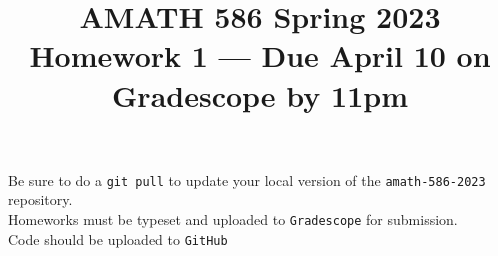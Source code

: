 \documentclass[10pt]{amsart}
\begin{document}
\pagestyle{empty}

\newcommand{\mline}{\vspace{.2in}\hrule\vspace{.2in}}


\title{\bf { AMATH 586 Spring 2023 \\ Homework 1 ---
Due April 10 on Gradescope by 11pm} }
\maketitle
\begin{center} Be sure to do a {\tt git pull} to update your local
  version of the {\tt amath-586-2023} repository.\\  Homeworks must be
  typeset and uploaded to {\tt Gradescope} for submission.\\
  Code should be uploaded to {\tt GitHub}
  \end{center}
\end{document}
